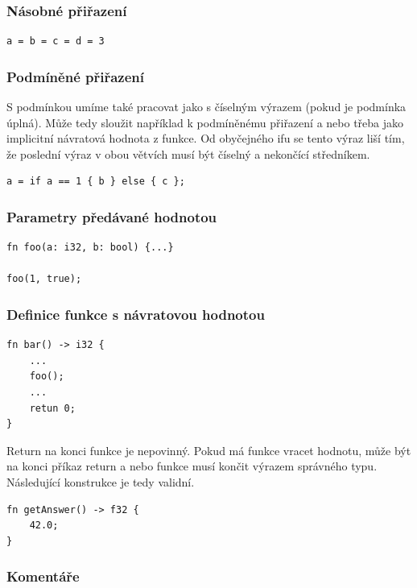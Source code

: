 \documentclass[12pt,a4paper]{article}
\begin{document}
\subsubsection*{Násobné přiřazení}

\begin{verbatim}
a = b = c = d = 3
	\end{verbatim}

\subsubsection*{Podmíněné přiřazení}
S podmínkou umíme také pracovat jako s číselným výrazem (pokud je podmínka úplná). Může tedy sloužit například k podmíněnému přiřazení a nebo třeba jako implicitní návratová hodnota z funkce. 
Od obyčejného ifu se tento výraz liší tím, že poslední výraz v obou větvích musí být číselný a nekončící středníkem.
\begin{verbatim}
a = if a == 1 { b } else { c };
\end{verbatim}

\subsubsection*{Parametry předávané hodnotou}

\begin{verbatim}
fn foo(a: i32, b: bool) {...}

foo(1, true);
\end{verbatim}

\subsubsection*{Definice funkce s návratovou hodnotou}

\begin{verbatim}
fn bar() -> i32 {
    ...
    foo();
    ...
    retun 0;
}
\end{verbatim}

\noindent
Return na konci funkce je nepovinný. Pokud má funkce vracet hodnotu, může být na konci příkaz return a nebo funkce musí končit výrazem správného typu. Následující konstrukce je tedy validní.

\begin{verbatim}
fn getAnswer() -> f32 {
    42.0;
}
\end{verbatim}


\subsubsection*{Komentáře}
\end{document}
